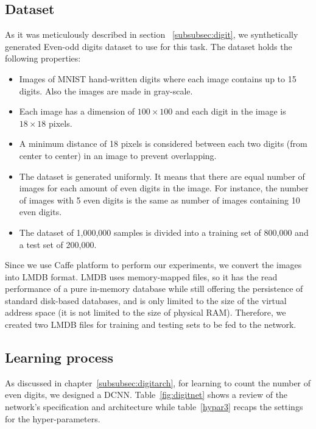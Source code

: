 \subsection{Dataset} 
As it was meticulously described in section ~\ref{subsubsec:digit}, we synthetically generated Even-odd digits dataset to use for this task. The dataset holds the following properties:
\begin{itemize}
\item Images of MNIST hand-written digits where each image contains up to 15 digits. Also the images are made in gray-scale.
\item Each image has a dimension of $100\times100$ and each digit in the image is $18\times18$ pixels.  
\item A minimum distance of 18 pixels is considered between each two digits (from center to center) in an image to prevent overlapping.
\item The dataset is generated uniformly. It means that there are equal number of images for each amount of even digits in the image. For instance, the number of images with 5 even digits is the same as number of images containing 10 even digits.
\item The dataset of 1,000,000 samples is divided into a training set of 800,000 and a test set of 200,000. 
\end{itemize}

Since we use Caffe platform to perform our experiments, we convert the images into LMDB format. LMDB uses memory-mapped files, so it has the read performance of a pure in-memory database while still offering the persistence of standard disk-based databases, and is only limited to the size of the virtual address space (it is not limited to the size of physical RAM). Therefore, we created two LMDB files for training and testing sets to be fed to the network.  

\subsection{Learning process}

As discussed in chapter~\ref{subsubsec:digitarch}, for learning to count the number of even digits, we designed a DCNN. Table~\ref{fig:digitnet} shows a review of the network's specification and architecture while table~\ref{hypar3} recaps the settings for the hyper-parameters.


